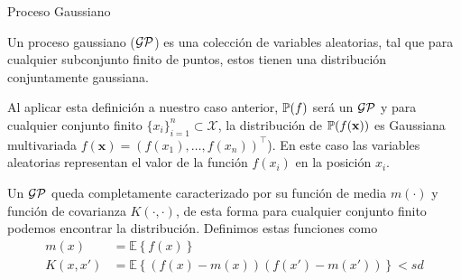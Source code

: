 \documentclass[9pt]{beamer}
\begin{document}
\begin{frame}{Proceso Gaussiano}

\begin{definition}
  Un proceso gaussiano ($\mathcal{GP}$) es una colección de variables aleatorias, tal que para cualquier subconjunto finito de puntos, estos tienen una distribución conjuntamente gaussiana.
\end{definition} \pause

Al aplicar esta definición a nuestro caso anterior, $\mathbb{P}(f)$ será un $\mathcal{GP}$ y para cualquier conjunto finito $\{ x_i\}_{i=1}^{n}  \subset \mathcal{X}$, la distribución de $\mathbb{P}(f(\mathbf{x}))$ es Gaussiana multivariada $f(\mathbf{x})=(f(x_1), \ldots, f(x_n))^\top$). En este caso las variables aleatorias representan el valor de la función $f(x_i)$ en la posición $x_i$. \pause
\vspace{0.2cm}

Un $\mathcal{GP}$ queda completamente caracterizado por su función de media $m(\cdot)$ y función de covarianza $K(\cdot, \cdot)$, de esta forma para cualquier conjunto finito podemos encontrar la distribución. Definimos estas funciones como
\begin{align*}
  m(x) & = \mathbb{E}\left\{f(x)\right\}\\
  K(x, x') & = \mathbb{E}\left\{\left(f(x) - m(x)\right) \left(f(x') - m(x') \right)\right\}<sd
\end{align*}


\end{frame}
\end{document}
